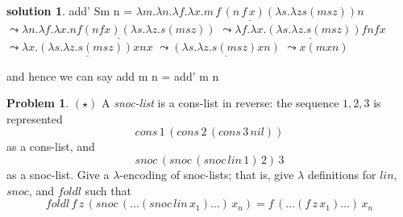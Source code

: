\documentclass[10pt]{article}
\theoremstyle{definition}
\newtheorem{prob}{Problem}
\newtheorem{sol}{solution}
\begin{document}
\begin{sol}
	add' Sm n = \newline
	$ \underline{\lambda m.\lambda n.\lambda f.\lambda x. m\,f\,(n\,f\,x)( \lambda s. \lambda z s (m s z)) n }$ \newline
	$ \leadsto \underline{\lambda n. \lambda f. \lambda x. n f(n f x)( \lambda s. \lambda z. s (m s z))}$ \newline
	$ \leadsto \underline{ \lambda f. \lambda x. ( \lambda s. \lambda z. s (m s z))f n f x} $ \newline
	$ \leadsto \underline{ \lambda x. ( \lambda s. \lambda z. s (m s z))x n x} $ \newline
	$ \leadsto \underline{ ( \lambda s. \lambda z. s (m s z)x n)} $ \newline
	$ \leadsto x( m x n)$ \newline

	and hence we can say add m n = add' m n




\end{sol}

\begin{prob}
	$(\star)$ A \emph{snoc-list} is a cons-list in reverse: the sequence $1, 2, 3$ is represented
	\[
		cons\,1\,(cons\,2\,(cons\,3\,nil))
	\]
	as a cons-list, and
	\[
		snoc\,(snoc\,(snoc\,lin\,1)\,2)\,3
	\]
	as a snoc-list.  Give a $\lambda$-encoding of snoc-lists; that is, give $\lambda$ definitions for $lin$, $snoc$, and $foldl$ such that
	\[
		foldl\,f\,z\,(snoc\,(\dots(snoc\,lin\,x_1)\dots)\,x_n) = f\,(\dots(f\,z\,x_1)\dots)\,x_n
	\]
\end{prob}
\end{document}
